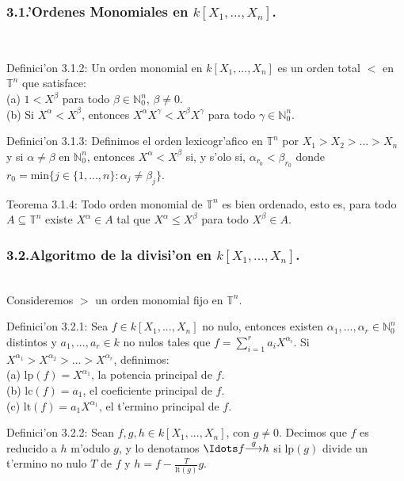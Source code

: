 \documentclass[10pt]{beamer}
\renewcommand{\T}{\mathbb{T}^n}
\renewcommand{\N}{\mathbb{N}}
\renewcommand{\lp}{\text{lp}}
\renewcommand{\lt}{\text{lt}}
\begin{document}
\begin{frame}
\frametitle{3.1.'Ordenes Monomiales en $k[X_1,...,X_n]$.}\\
\begin{block}{Definici'on 3.1.2:}
Un orden monomial en $k[X_1,...,X_n]$ es un orden total $<$ en $\T$ que satisface:\\
(a) $1<X^{\beta}$ para todo $\beta \in \N_0^n$, $\beta \not = 0$.\\
(b) Si $X^{\alpha}<X^{\beta}$, entonces $X^{\alpha}X^{\gamma}<X^{\beta}X^{\gamma}$ para todo $\gamma \in \N_0^n$.\\
\end{block}
\begin{block}{Definici'on 3.1.3:}
Definimos el orden lexicogr'afico en $\T$ por $X_1>X_2>...>X_n$ y si $\alpha \not = \beta$ en $\N _0^n$, entonces $X^{\alpha}<X^{\beta}$ si, y s'olo si, $\alpha _{r_0} < \beta _{r_0}$ donde $r_0=\text{min}\{ j \in \{ 1,...,n\}:\alpha _j \not = \beta _j\}$.\\
\end{block}
\begin{block}{Teorema 3.1.4:}
Todo orden monomial de $\T$ es bien ordenado, esto es, para todo $A \subseteq \T$ existe $X^{\alpha} \in A$ tal que $X^{\alpha} \leq X^{\beta}$ para todo $X^{\beta} \in A$.\\
\end{block}
\vspace{4cm}
\end{frame}





\begin{frame}
\frametitle{3.2.Algoritmo de la divisi'on en $k[X_1,...,X_n]$.}\\
Consideremos $>$ un orden monomial fijo en $\T$.\\
\begin{block}{Definici'on 3.2.1:}
Sea $f \in k[X_1,...,X_n]$ no nulo, entonces existen $\alpha_1,...,\alpha_r \in \N_0^n$ distintos y  $a_1,...,a_r \in k$ no nulos tales que $f = \sum _{i=1}^{r}{a_iX^{\alpha_i}}$. Si $X^{\alpha_1}>X^{\alpha_2}>...>X^{\alpha_r}$, definimos:\\
(a) $\text{lp}(f)=X^{\alpha_1}$, la potencia principal de $f$.\\
(b) $\text{lc}(f)=a_1$, el coeficiente principal de $f$.\\
(c) $\text{lt}(f)=a_1X^{\alpha_1}$, el t'ermino principal de $f$.\\
\end{block}
\begin{block}{Definici'on 3.2.2:}
Sean $f,g,h \in k[X_1,...,X_n]$, con $g \not = 0$. Decimos que $f$ es reducido a $h$ m'odulo $g$, y lo denotamos $\displaystyle \Idots f {\overset{g}{\longrightarrow}} h$ si $\lp(g)$ divide un t'ermino no nulo $T$ de $f$ y $h=f-\frac{T}{\lt(g)}g$.\\
\end{block}
\vspace{5cm}
\end{frame}
\end{document}
